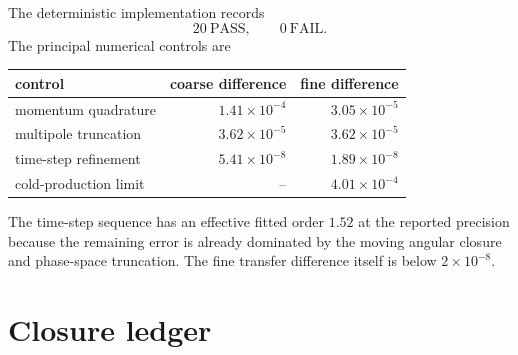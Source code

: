 The deterministic implementation records
\begin{equation}
 \boxed{20\ \mathrm{PASS},\qquad0\ \mathrm{FAIL}.}
 \label{eq:cb-check-count}
\end{equation}
The principal numerical controls are
\begin{center}
\begin{tabular}{lrr}
\toprule
control & coarse difference & fine difference\\
\midrule
momentum quadrature & $1.41\times10^{-4}$ & $3.05\times10^{-5}$\\
multipole truncation & $3.62\times10^{-5}$ & $3.62\times10^{-5}$\\
time-step refinement & $5.41\times10^{-8}$ & $1.89\times10^{-8}$\\
cold-production limit & -- & $4.01\times10^{-4}$\\
\bottomrule
\end{tabular}
\end{center}
The time-step sequence has an effective fitted order $1.52$ at the reported precision because the remaining error is already dominated by the moving angular closure and phase-space truncation.  The fine transfer difference itself is below $2\times10^{-8}$.

\section{Closure ledger}

